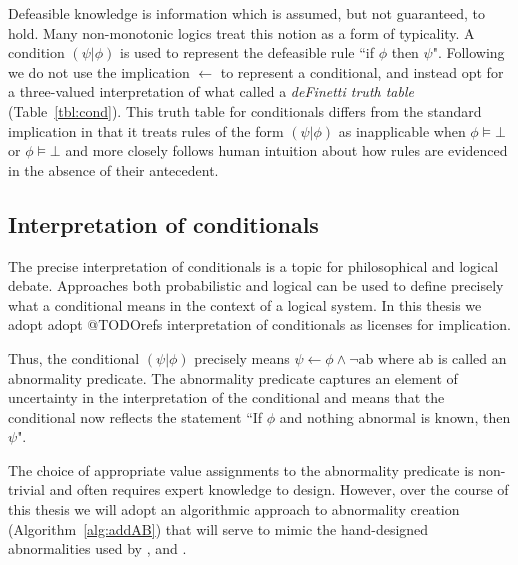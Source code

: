 Defeasible knowledge is information which is assumed, but not guaranteed, to hold. Many non-monotonic logics treat this notion as a form of typicality. A condition $(\psi|\phi)$ is used to represent the defeasible rule ``if $\phi$ then $\psi$". Following \citep{wason1968reasoning} we do not use the implication $\leftarrow$ to represent a conditional, and instead opt for a three-valued interpretation of what \citep{baratgin2014new} called a \textit{deFinetti truth table} (Table~\ref{tbl:cond}). This truth table for conditionals differs from the standard implication in that it treats rules of the form $(\psi|\phi)$ as inapplicable when $\phi \models \bot$ or $\phi \models \bot$ and more closely follows human intuition about how rules are evidenced in the absence of their antecedent.

\subsection{Interpretation of conditionals} \label{ssec:condInterpretation}
The precise interpretation of conditionals is a topic for philosophical and logical debate. Approaches both probabilistic and logical can be used to define precisely what a conditional means in the context of a logical system. In this thesis we adopt adopt @TODOrefs interpretation of conditionals as licenses for implication. 

Thus, the conditional $(\psi|\phi)$ precisely means $\psi \leftarrow \phi \land \lnot \text{ab}$ where $\text{ab}$ is called an abnormality predicate. The abnormality predicate captures an element of uncertainty in the interpretation of the conditional and means that the conditional now reflects the statement ``If $\phi$ and nothing abnormal is known, then $\psi$".

The choice of appropriate value assignments to the abnormality predicate is non-trivial and often requires expert knowledge to design. However, over the course of this thesis we will adopt an algorithmic approach to abnormality creation (Algorithm~\ref{alg:addAB}) that will serve to mimic the hand-designed abnormalities used by \citep{dietz2012computational}, and \citep{breu2019weak}.


